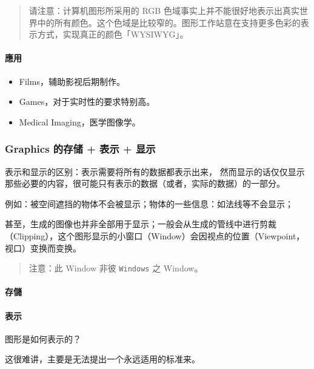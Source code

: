 \documentclass[
]{article}
\begin{document}
\begin{quote}
请注意：计算机图形所采用的 RGB
色域事实上并不能很好地表示出真实世界中的所有颜色。这个色域是比较窄的。图形工作站意在支持更多色彩的表示方式，实现真正的颜色「WYSIWYG」。
\end{quote}

\hypertarget{header-n137}{%
\paragraph{應用}\label{header-n137}}

\begin{itemize}
\item
  Films，辅助影视后期制作。
\item
  Games，对于实时性的要求特别高。
\item
  Medical Imaging，医学图像学。
\end{itemize}

\hypertarget{header-n145}{%
\subsubsection{Graphics 的存储 + 表示 + 显示}\label{header-n145}}

表示和显示的区别：表示需要将所有的数据都表示出来，
然而显示的话仅仅显示那些必要的内容，很可能只有表示的数据（或者，实际的数据）的一部分。

例如：被空间遮挡的物体不会被显示；物体的一些信息：如法线等不会显示；

甚至，生成的图像也并非全部用于显示；一般会从生成的管线中进行剪裁（Clipping），这个图形显示的小窗口（Window）会因视点的位置（Viewpoint，视口）变换而变换。

\begin{quote}
注意：此 Window 非彼 \texttt{Windows} 之 Window。
\end{quote}

\hypertarget{header-n151}{%
\paragraph{存儲}\label{header-n151}}

\hypertarget{header-n152}{%
\paragraph{表示}\label{header-n152}}

图形是如何表示的？

这很难讲，主要是无法提出一个永远适用的标准来。
\end{document}

